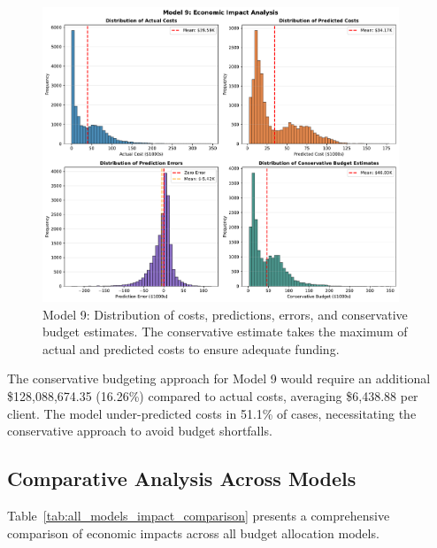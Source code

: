 \begin{figure}[htbp]
\centering
\includegraphics[width=0.95\textwidth]{figures/model_9_Impact_Histograms.pdf}
\caption{Model 9: Distribution of costs, predictions, errors, and conservative budget estimates. The conservative estimate takes the maximum of actual and predicted costs to ensure adequate funding.}
\label{fig:model9_impact_histograms}
\end{figure}

The conservative budgeting approach for Model 9 would require an additional \$128,088,674.35 (16.26\%) compared to actual costs, averaging \$6,438.88 per client. The model under-predicted costs in 51.1\% of cases, necessitating the conservative approach to avoid budget shortfalls.

\clearpage

\subsection{Comparative Analysis Across Models}
\label{subsec:comparative_impact}

Table~\ref{tab:all_models_impact_comparison} presents a comprehensive comparison of economic impacts across all budget allocation models.

